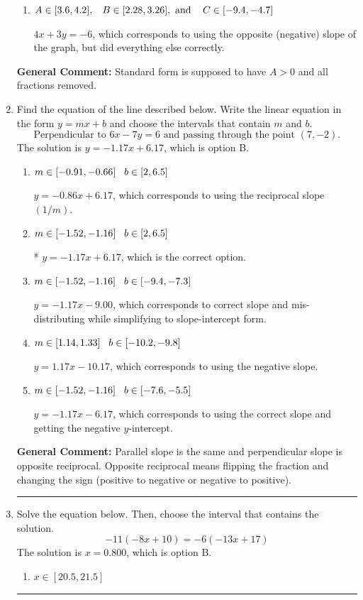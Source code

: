 \documentclass{extbook}[14pt]
\newcommand{\litem}[1]{\item #1

\rule{\textwidth}{0.4pt}}
\begin{document}
\begin{enumerate}
{\begin{enumerate}[label=\Alph*.]
 $-4x + 3y = -6$, which corresponds to not making $A$ positive (by multiplying the equation by $-1$).
\item \( A \in [3.6, 4.2], \hspace{3mm} B \in [2.28, 3.26], \text{ and } \hspace{3mm} C \in [-9.4, -4.7] \)

 $4x + 3y = -6$, which corresponds to using the opposite (negative) slope of the graph, but did everything else correctly.
\end{enumerate}

\textbf{General Comment:} Standard form is supposed to have $A > 0$ and all fractions removed.
}
\litem{
Find the equation of the line described below. Write the linear equation in the form $ y=mx+b $ and choose the intervals that contain $m$ and $b$.
\[ \text{Perpendicular to } 6 x - 7 y = 6 \text{ and passing through the point } (7, -2). \]The solution is \( y = -1.17x + 6.17 \), which is option B.\begin{enumerate}[label=\Alph*.]
\item \( m \in [-0.91, -0.66] \hspace*{3mm} b \in [2, 6.5] \)

 $y = -0.86x + 6.17$, which corresponds to using the reciprocal slope $(1/m)$.
\item \( m \in [-1.52, -1.16] \hspace*{3mm} b \in [2, 6.5] \)

* $y = -1.17x + 6.17$, which is the correct option.
\item \( m \in [-1.52, -1.16] \hspace*{3mm} b \in [-9.4, -7.3] \)

 $y = -1.17x - 9.00$, which corresponds to correct slope and mis-distributing while simplifying to slope-intercept form.
\item \( m \in [1.14, 1.33] \hspace*{3mm} b \in [-10.2, -9.8] \)

 $y = 1.17x - 10.17$, which corresponds to using the negative slope.
\item \( m \in [-1.52, -1.16] \hspace*{3mm} b \in [-7.6, -5.5] \)

 $y = -1.17x - 6.17$, which corresponds to using the correct slope and getting the negative $y$-intercept.
\end{enumerate}

\textbf{General Comment:} Parallel slope is the same and perpendicular slope is opposite reciprocal. Opposite reciprocal means flipping the fraction and changing the sign (positive to negative or negative to positive).
}
\litem{
Solve the equation below. Then, choose the interval that contains the solution.
\[ -11(-8x + 10) = -6(-13x + 17) \]The solution is \( x = 0.800 \), which is option B.\begin{enumerate}[label=\Alph*.]
\item \( x \in [20.5, 21.5] \)


\end{enumerate}}
\end{enumerate}
\end{document}
